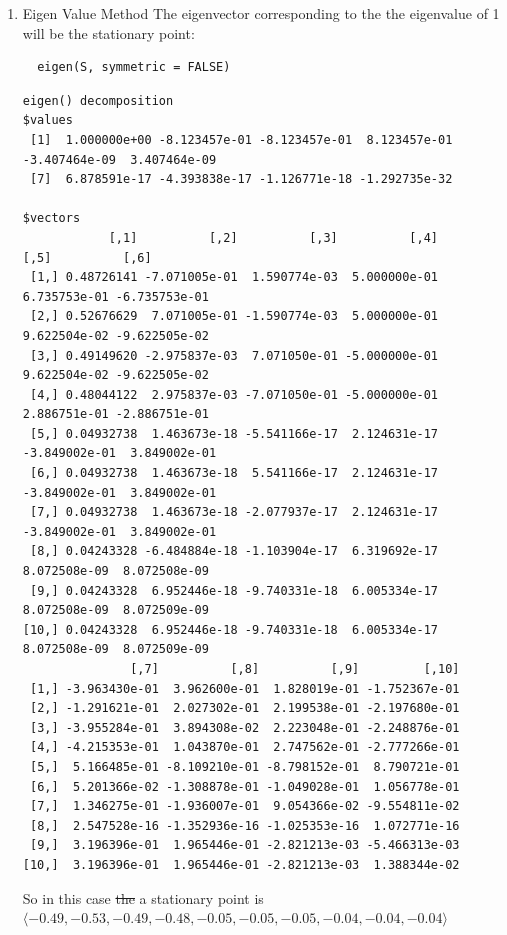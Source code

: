 \documentclass[11pt]{article}
\begin{document}
\begin{enumerate}
\item Eigen Value Method
\label{eigen-value-method}
The eigenvector corresponding to the the eigenvalue of 1 will be the
stationary point:

\lstset{language=r,label= ,caption= ,captionpos=b,numbers=none}
\begin{lstlisting}
  eigen(S, symmetric = FALSE)
\end{lstlisting}

\begin{verbatim}
eigen() decomposition
$values
 [1]  1.000000e+00 -8.123457e-01 -8.123457e-01  8.123457e-01 -3.407464e-09  3.407464e-09
 [7]  6.878591e-17 -4.393838e-17 -1.126771e-18 -1.292735e-32

$vectors
            [,1]          [,2]          [,3]          [,4]          [,5]          [,6]
 [1,] 0.48726141 -7.071005e-01  1.590774e-03  5.000000e-01  6.735753e-01 -6.735753e-01
 [2,] 0.52676629  7.071005e-01 -1.590774e-03  5.000000e-01  9.622504e-02 -9.622505e-02
 [3,] 0.49149620 -2.975837e-03  7.071050e-01 -5.000000e-01  9.622504e-02 -9.622505e-02
 [4,] 0.48044122  2.975837e-03 -7.071050e-01 -5.000000e-01  2.886751e-01 -2.886751e-01
 [5,] 0.04932738  1.463673e-18 -5.541166e-17  2.124631e-17 -3.849002e-01  3.849002e-01
 [6,] 0.04932738  1.463673e-18  5.541166e-17  2.124631e-17 -3.849002e-01  3.849002e-01
 [7,] 0.04932738  1.463673e-18 -2.077937e-17  2.124631e-17 -3.849002e-01  3.849002e-01
 [8,] 0.04243328 -6.484884e-18 -1.103904e-17  6.319692e-17  8.072508e-09  8.072508e-09
 [9,] 0.04243328  6.952446e-18 -9.740331e-18  6.005334e-17  8.072508e-09  8.072509e-09
[10,] 0.04243328  6.952446e-18 -9.740331e-18  6.005334e-17  8.072508e-09  8.072509e-09
               [,7]          [,8]          [,9]         [,10]
 [1,] -3.963430e-01  3.962600e-01  1.828019e-01 -1.752367e-01
 [2,] -1.291621e-01  2.027302e-01  2.199538e-01 -2.197680e-01
 [3,] -3.955284e-01  3.894308e-02  2.223048e-01 -2.248876e-01
 [4,] -4.215353e-01  1.043870e-01  2.747562e-01 -2.777266e-01
 [5,]  5.166485e-01 -8.109210e-01 -8.798152e-01  8.790721e-01
 [6,]  5.201366e-02 -1.308878e-01 -1.049028e-01  1.056778e-01
 [7,]  1.346275e-01 -1.936007e-01  9.054366e-02 -9.554811e-02
 [8,]  2.547528e-16 -1.352936e-16 -1.025353e-16  1.072771e-16
 [9,]  3.196396e-01  1.965446e-01 -2.821213e-03 -5.466313e-03
[10,]  3.196396e-01  1.965446e-01 -2.821213e-03  1.388344e-02

\end{verbatim}

So in this case \sout{the} a stationary point is
\(\langle -0.49, -0.53, -0.49, -0.48, -0.05, -0.05, -0.05, -0.04, -0.04, -0.04 \rangle\)


\end{enumerate}
\end{document}
